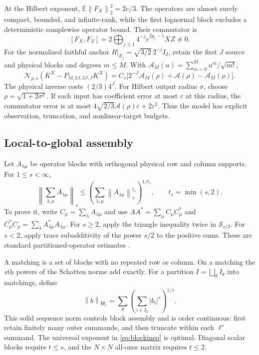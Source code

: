 \documentclass[11pt,a4paper]{amsart}
\numberwithin{equation}{section}
\theoremstyle{definition}
\theoremstyle{remark}
\newcommand{\E}{\mathbb E}
\newcommand{\Sch}{\mathcal S}
\newcommand{\norm}[1]{\left\lVert#1\right\rVert}
\newcommand{\Nn}[2]{\mathcal N_{#1,s}(#2)}
\begin{document}
At the Hilbert exponent, $\E\norm{F_X}_2^2=2e/3$. The operators are almost surely compact, bounded, and infinite-rank, while the first lognormal block excludes a deterministic samplewise operator bound. Their commutator is
\begin{equation}\label{eq:modelcommutator}
 [F_X,F_Z]=2\bigoplus_{j\ge1}4^{-j}e^{2g_j-1}XZ\ne0.
\end{equation}
For the normalized faithful anchor $R|_{E_j}=\sqrt{3/2}\,2^{-j}I_2$, retain the first $J$ source and physical blocks and degrees $m\le M$. With $\mathcal A_M(u)=\sum_{m=0}^Mu^m/\sqrt{m!}$,
\begin{equation}\label{eq:modeltail}
 \Nn\rho{K^X-P_{M,2J,2J,J}K^X}
 =C_s\big[2^{-J}\mathcal A_M(\rho)+\mathcal A(\rho)-\mathcal A_M(\rho)\big].
\end{equation}
The physical inverse costs $(2/3)4^J$. For Hilbert output radius $\sigma$, choose $\rho=\sqrt{1+2\sigma^2}$. If each input has coefficient error at most $\varepsilon$ at this radius, the commutator error is at most
$4\sqrt{2/3}\mathcal A(\rho)\varepsilon+2\varepsilon^2$.
Thus the model has explicit observation, truncation, and nonlinear-target budgets.

\subsection{Local-to-global assembly}
Let $A_{\lambda\mu}$ be operator blocks with orthogonal physical row and column supports. For $1\le s<\infty$,
\begin{equation}\label{eq:blockineq}
 \left\|\sum_{\lambda,\mu}A_{\lambda\mu}\right\|_s
 \le\left(\sum_{\lambda,\mu}\norm{A_{\lambda\mu}}_s^{t_s}\right)^{1/t_s},
 \qquad t_s=\min(s,2).
\end{equation}
To prove it, write $C_\mu=\sum_\lambda A_{\lambda\mu}$ and use
$AA^*=\sum_\mu C_\mu C_\mu^*$ and
$C_\mu^*C_\mu=\sum_\lambda A_{\lambda\mu}^*A_{\lambda\mu}$.
For $s\ge2$, apply the triangle inequality twice in $\Sch_{s/2}$. For $s<2$, apply trace subadditivity of the power $s/2$ to the positive sums. These are standard partitioned-operator estimates \cite{BK,BLP,Simon}.

A matching is a set of blocks with no repeated row or column. On a matching the $s$th powers of the Schatten norms add exactly. For a partition $I=\bigsqcup_\theta I_\theta$ into matchings, define
\begin{equation}\label{eq:matchinglattice}
 \norm b_{\mathsf M_s}=\sum_\theta\left(\sum_{i\in I_\theta}|b_i|^s\right)^{1/s}.
\end{equation}
This solid sequence norm controls block assembly and is order continuous: first retain finitely many outer summands, and then truncate within each $\ell^s$ summand. The universal exponent in \eqref{eq:blockineq} is optimal. Diagonal scalar blocks require $t\le s$, and the $N\times N$ all-ones matrix requires $t\le2$.
\end{document}
